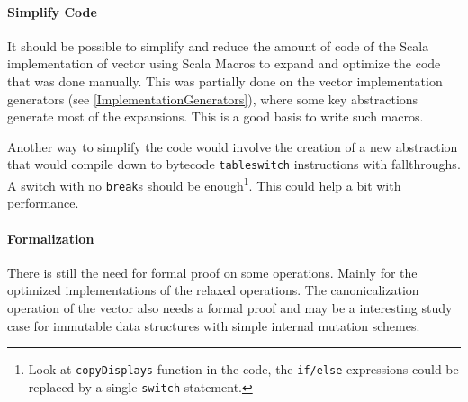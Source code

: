 \paragraph{Simplify Code}
It should be possible to simplify and reduce the amount of code of the Scala implementation of vector using Scala Macros \cite{EPFL-CONF-186844}  to expand and optimize the code that was done manually. This was partially done on the vector implementation generators (see \ref{ImplementationGenerators}), where some key abstractions generate most of the expansions. This is a good basis to write such macros.

Another way to simplify the code would involve the creation of a new abstraction that would compile down to bytecode \texttt{tableswitch} instructions with fallthroughs. A switch with no \texttt{break}s should be enough\footnote{Look at \texttt{copyDisplays} function in the code, the \texttt{if/else} expressions could be replaced by a single \texttt{switch} statement.}. This could help a bit with performance.

\paragraph{Formalization}
There is still the need for formal proof on some operations. Mainly for the optimized implementations of the relaxed operations. The canonicalization operation of the vector also needs a formal proof and may be a interesting study case for immutable data structures with simple internal mutation schemes.


